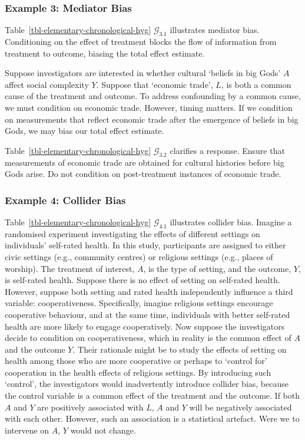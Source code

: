 \documentclass[
  single column]{article}
\begin{document}
\subsubsection{Example 3: Mediator Bias}\label{example-3-mediator-bias}

Table~\ref{tbl-elementary-chronological-hyg} \(\mathcal{G}_{3.1}\)
illustrates mediator bias. Conditioning on the effect of treatment
blocks the flow of information from treatment to outcome, biasing the
total effect estimate.

Suppose investigators are interested in whether cultural `beliefs in big
Gods' \(A\) affect social complexity \(Y\). Suppose that `economic
trade', \(L\), is both a common cause of the treatment and outcome. To
address confounding by a common cause, we must condition on economic
trade. However, timing matters. If we condition on measurements that
reflect economic trade after the emergence of beliefs in big Gods, we
may bias our total effect estimate.

Table~\ref{tbl-elementary-chronological-hyg} \(\mathcal{G}_{3.2}\)
clarifies a response. Ensure that measurements of economic trade are
obtained for cultural histories before big Gods arise. Do not condition
on post-treatment instances of economic trade.

\subsubsection{Example 4: Collider Bias}\label{example-4-collider-bias}

Table~\ref{tbl-elementary-chronological-hyg} \(\mathcal{G}_{4.1}\)
illustrates collider bias. Imagine a randomised experiment investigating
the effects of different settings on individuals' self-rated health. In
this study, participants are assigned to either civic settings (e.g.,
community centres) or religious settings (e.g., places of worship). The
treatment of interest, \(A\), is the type of setting, and the outcome,
\(Y\), is self-rated health. Suppose there is no effect of setting on
self-rated health. However, suppose both setting and rated health
independently influence a third variable: cooperativeness. Specifically,
imagine religious settings encourage cooperative behaviour, and at the
same time, individuals with better self-rated health are more likely to
engage cooperatively. Now suppose the investigators decide to condition
on cooperativeness, which in reality is the common effect of \(A\) and
the outcome \(Y\). Their rationale might be to study the effects of
setting on health among those who are more cooperative or perhaps to
`control for' cooperation in the health effects of religious settings.
By introducing such `control', the investigators would inadvertently
introduce collider bias, because the control variable is a common effect
of the treatment and the outcome. If both \(A\) and \(Y\) are positively
associated with \(L\), \(A\) and \(Y\) will be negatively associated
with each other. However, such an association is a statistical artefact.
Were we to intervene on \(A\), \(Y\) would not change.
\end{document}
